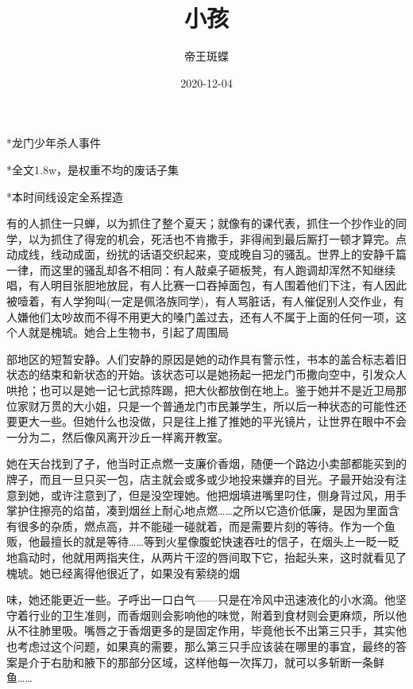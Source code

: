 \documentclass{article}
\title{小孩}
\author{帝王斑蝶}
\date{2020-12-04}
\begin{document}

\maketitle


\Large

﻿*龙门少年杀人事件

*全文1.8w，是权重不均的废话子集

*本时间线设定全系捏造

有的人抓住一只蝉，以为抓住了整个夏天；就像有的课代表，抓住一个抄作业的同学，以为抓住了得宠的机会，死活也不肯撒手，非得闹到最后厮打一顿才算完。点动成线，线动成面，纷扰的话语交织起来，变成晚自习的骚乱。世界上的安静千篇一律，而这里的骚乱却各不相同：有人敲桌子砸板凳，有人跑调却浑然不知继续唱，有人明目张胆地放屁，有人比赛一口吞掉面包，有人围着他们下注，有人因此被噎着，有人学狗叫(一定是佩洛族同学)，有人骂脏话，有人催促别人交作业，有人嫌他们太吵故而不得不用更大的嗓门盖过去，还有人不属于上面的任何一项，这个人就是槐琥。她合上生物书，引起了周围局

\newpage 

部地区的短暂安静。人们安静的原因是她的动作具有警示性，书本的盖合标志着旧状态的结束和新状态的开始。该状态可以是她扬起一把龙门币撒向空中，引发众人哄抢；也可以是她一记七武掠阵踢，把大伙都放倒在地上。鉴于她并不是近卫局那位家财万贯的大小姐，只是一个普通龙门市民兼学生，所以后一种状态的可能性还要更大一些。但她什么也没做，只是往上推了推她的平光镜片，让世界在眼中不会一分为二，然后像风离开沙丘一样离开教室。

她在天台找到了孑，他当时正点燃一支廉价香烟，随便一个路边小卖部都能买到的牌子，而且一旦只买一包，店主就会或多或少地投来嫌弃的目光。孑最开始没有注意到她，或许注意到了，但是没空理她。他把烟填进嘴里叼住，侧身背过风，用手掌护住擦亮的焰苗，凑到烟丝上耐心地点燃……之所以它造价低廉，是因为里面含有很多的杂质，燃点高，并不能碰一碰就着，而是需要片刻的等待。作为一个鱼贩，他最擅长的就是等待……等到火星像腹蛇快速吞吐的信子，在烟头上一眨一眨地翕动时，他就用两指夹住，从两片干涩的唇间取下它，抬起头来，这时就看见了槐琥。她已经离得他很近了，如果没有萦绕的烟

\newpage 

味，她还能更近一些。孑呼出一口白气——只是在冷风中迅速液化的小水滴。他坚守着行业的卫生准则，而香烟则会影响他的味觉，附着到食材则会更麻烦，所以他从不往肺里吸。嘴唇之于香烟更多的是固定作用，毕竟他长不出第三只手，其实他也考虑过这个问题，如果真的需要，那么第三只手应该装在哪里的事宜，最终的答案是介于右肋和腋下的那部分区域，这样他每一次挥刀，就可以多斩断一条鲜鱼……
\end{document}
